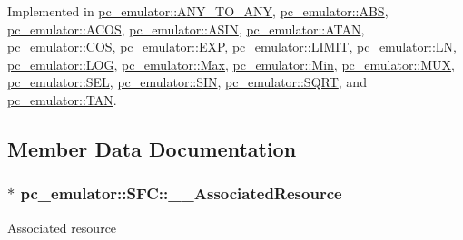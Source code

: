 Implemented in \hyperlink{classpc__emulator_1_1ANY__TO__ANY_abd6bf0496fa8d85b7194024b5462a0af}{pc\+\_\+emulator\+::\+A\+N\+Y\+\_\+\+T\+O\+\_\+\+A\+NY}, \hyperlink{classpc__emulator_1_1ABS_ac17315794160f617479e033609ed5f7c}{pc\+\_\+emulator\+::\+A\+BS}, \hyperlink{classpc__emulator_1_1ACOS_ab1011f059918ccb28c9309f18b01cb32}{pc\+\_\+emulator\+::\+A\+C\+OS}, \hyperlink{classpc__emulator_1_1ASIN_aa2c2e179a0d54f6cf2754c7ac4c36d62}{pc\+\_\+emulator\+::\+A\+S\+IN}, \hyperlink{classpc__emulator_1_1ATAN_a67a62838992aa4ccca28250a8f5b9a81}{pc\+\_\+emulator\+::\+A\+T\+AN}, \hyperlink{classpc__emulator_1_1COS_a66dc96f691d55d42fa20c55a5ed71a4f}{pc\+\_\+emulator\+::\+C\+OS}, \hyperlink{classpc__emulator_1_1EXP_aa5a73e7f83ab1b8c692d8a40c634f967}{pc\+\_\+emulator\+::\+E\+XP}, \hyperlink{classpc__emulator_1_1LIMIT_af8015be356d3994def6ee0bf67984bb3}{pc\+\_\+emulator\+::\+L\+I\+M\+IT}, \hyperlink{classpc__emulator_1_1LN_ae132a2caf03e39d1984a3b4e9f7be374}{pc\+\_\+emulator\+::\+LN}, \hyperlink{classpc__emulator_1_1LOG_a47e1208a029c4f2c086e0cdc0ac8e215}{pc\+\_\+emulator\+::\+L\+OG}, \hyperlink{classpc__emulator_1_1Max_a69f272b0595cb79620251b28a9711b74}{pc\+\_\+emulator\+::\+Max}, \hyperlink{classpc__emulator_1_1Min_a514862be9783380e78e8079cae70dd04}{pc\+\_\+emulator\+::\+Min}, \hyperlink{classpc__emulator_1_1MUX_abae7cc0b591d2605033ce0aece5d291f}{pc\+\_\+emulator\+::\+M\+UX}, \hyperlink{classpc__emulator_1_1SEL_a59af58bd0cba07f2ccbc35c5187e2bd6}{pc\+\_\+emulator\+::\+S\+EL}, \hyperlink{classpc__emulator_1_1SIN_a924d58a3aa229aafd276ff97ae774c2f}{pc\+\_\+emulator\+::\+S\+IN}, \hyperlink{classpc__emulator_1_1SQRT_aeeadaf7985a205f39b22fe544022bd57}{pc\+\_\+emulator\+::\+S\+Q\+RT}, and \hyperlink{classpc__emulator_1_1TAN_aee45e5d1c68b3cf4224dfdd8f8b2070e}{pc\+\_\+emulator\+::\+T\+AN}.



\subsection{Member Data Documentation}
\subsubsection[{\texorpdfstring{\+\_\+\+\_\+\+Associated\+Resource}{__AssociatedResource}}]{$\ast$ pc\+\_\+emulator\+::\+S\+F\+C\+::\+\_\+\+\_\+\+Associated\+Resource}\hypertarget{classpc__emulator_1_1SFC_ae1021fef00752f06a7c6e6641b3e913c}{}\label{classpc__emulator_1_1SFC_ae1021fef00752f06a7c6e6641b3e913c}
Associated resource 
